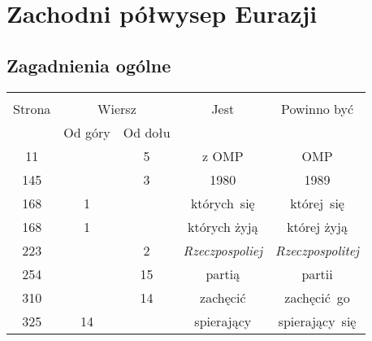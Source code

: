 \documentclass[a4paper,11pt]{article}
\begin{document}
\vspace{\spaceTwo}










\section{Zachodni półwysep Eurazji}

\vspace{\spaceTwo}



\subsection{Zagadnienia ogólne}

\vspace{\spaceThree}







\begin{center}

  \begin{tabular}{|c|c|c|c|c|}
    \hline
    & \multicolumn{2}{c|}{} & & \\
    Strona & \multicolumn{2}{c|}{Wiersz} & Jest
                              & Powinno być \\ \cline{2-3}
    & Od góry & Od dołu & & \\
    \hline
    11  & &  5 & z OMP & OMP \\
    145 & &  3 & 1980 & 1989 \\
    168 &  1 & & których~się & której~się \\
    168 &  1 & & których żyją & której żyją \\
    223 & &  2 & \emph{Rzeczpospoliej} & \emph{Rzeczpospolitej} \\
    254 & & 15 & partią & partii \\
    310 & & 14 & zachęcić & zachęcić~go \\
    325 & 14 & & spierający & spierający~się \\
    \hline
  \end{tabular}

\end{center}
\end{document}
